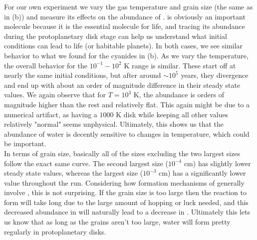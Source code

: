 \documentclass[11pt]{article}
\newenvironment{tight_enumerate}{
    \begin{enumerate}[label=(\alph*)]
    \setlength{\itemsep}{3pt}
    \setlength{\parskip}{0pt}}
    {\end{enumerate}}
\begin{document}
\begin{tight_enumerate}
\item For our own experiment we vary the gas temperature and grain size (the same as in (b)) and measure its effects on the abundance of .  is obviously an important molecule because it is the essential molecule for life, and tracing its abundance during the protoplanetary disk stage can help us understand what initial conditions can lead to life (or habitable planets). In both cases, we see similar behavior to what we found for the cyanides in (b). As we vary the temperature, the overall behavior for the $10^{-1}{-}10^2$ \si{K} range is similar. These start off at nearly the same initial conditions, but after around ${\sim}10^5$ years, they divergence and end up with about an order of magnitude difference in their steady state values. We again observe that for $T = 10^3$ \si{K}, the abundance is orders of magnitude higher than the rest and relatively flat. This again might be due to a numerical artifact, as having a $1000$ \si{K} disk while keeping all other values relatively "normal" seems unphysical. Ultimately, this shows us that the abundance of water is decently sensitive to changes in temperature, which could be important.\\
\indent\hspace{1em} In terms of grain size, basically all of the sizes excluding the two largest sizes follow the exact same curve. The second largest size ($10^{-4}$ \si{\centi\meter}) has slightly lower steady state values, whereas the largest size ($10^{-3}$ \si{\centi\meter}) has a significantly lower value throughout the run. Considering how formation mechanisms of  generally involve , this is not surprising. If the grain size is too large then the reaction to form  will take long due to the large amount of hopping or luck needed, and this decreased abundance in  will naturally lead to a decrease in . Ultimately this lets us know that as long as the grains aren't too large, water will form pretty regularly in protoplanetary disks.


\end{tight_enumerate}
\end{document}
